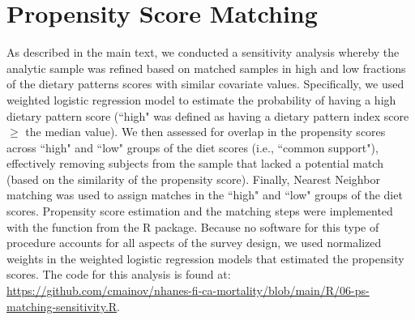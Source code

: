 \documentclass{article}
\begin{document}
\section{Propensity Score Matching}
\hspace{\parindent}As described in the main text, we conducted a sensitivity analysis whereby the analytic sample was refined based on matched samples in high and low fractions of the dietary patterns scores with similar covariate values.\supercite{austin2009relative} Specifically, we used weighted logistic regression model to estimate the probability of having a high dietary pattern score (``high" was defined as having a dietary pattern index score $\ge$ the median value). We then assessed for overlap in the propensity scores across ``high" and ``low" groups of the diet scores  (i.e., ``common support"), effectively removing subjects from the sample that lacked a potential match (based on the similarity of the propensity score).\supercite{garrido2014methods} Finally, Nearest Neighbor matching was used to assign matches in the ``high" and ``low" groups of the diet scores. \supercite{austin2014comparison} Propensity score estimation and the matching steps were implemented with the  {} function from the  {} R package.\supercite{matchitpackage} Because no software for this type of procedure accounts for all aspects of the survey design, we used normalized weights in the weighted logistic regression models that estimated the propensity scores. The code for this analysis is found at: \textcolor{blue}{\url{https://github.com/cmainov/nhanes-fi-ca-mortality/blob/main/R/06-ps-matching-sensitivity.R}}.


\printbibliography[title={References}]
\end{document}
